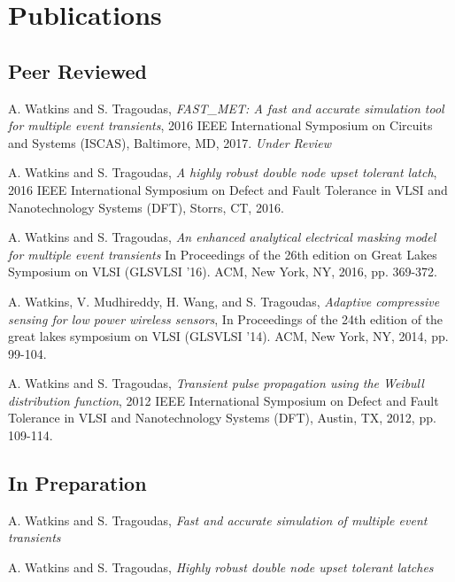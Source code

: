 \documentclass[letterpaper]{article}
\renewenvironment{itemize}{
  \begin{list}{}{
    \setlength{\leftmargin}{1.5em}
  }
}{
  \end{list}
}
\begin{document}
\section*{Publications}

\subsection*{Peer Reviewed}

\begin{itemize}
\item A. Watkins and S. Tragoudas, \emph{FAST\_MET: A fast and accurate simulation tool for multiple event transients}, 2016 IEEE International Symposium on Circuits and Systems (ISCAS), Baltimore, MD, 2017. \emph{Under Review}
	
\item A. Watkins and S. Tragoudas, \emph{A highly robust double node upset tolerant latch}, 2016 IEEE International Symposium on Defect and Fault Tolerance in VLSI and Nanotechnology Systems (DFT), Storrs, CT, 2016.
	
\item A. Watkins and S. Tragoudas, \emph{An enhanced analytical electrical masking model for multiple event transients} In Proceedings of the 26th edition on Great Lakes Symposium on VLSI (GLSVLSI '16). ACM, New York, NY, 2016, pp. 369-372.
	
\item A. Watkins, V. Mudhireddy, H. Wang, and S. Tragoudas, \emph{Adaptive compressive sensing for low power wireless sensors}, In Proceedings of the 24th edition of the great lakes symposium on VLSI (GLSVLSI '14). ACM, New York, NY, 2014, pp. 99-104.
	
\item A. Watkins and S. Tragoudas, \emph{Transient pulse propagation using the Weibull distribution function}, 2012 IEEE International Symposium on Defect and Fault Tolerance in VLSI and Nanotechnology Systems (DFT), Austin, TX, 2012, pp. 109-114.
\end{itemize}

\subsection*{In Preparation}

\begin{itemize}
\item A. Watkins and S. Tragoudas, \emph{Fast and accurate simulation of multiple event transients}

\item A. Watkins and S. Tragoudas, \emph{Highly robust double node upset tolerant latches}
\end{itemize}
\end{document}
